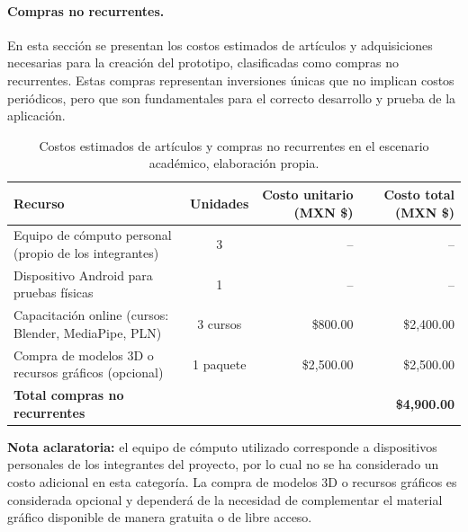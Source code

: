 \paragraph{\textbf{Compras no recurrentes.}} 
En esta sección se presentan los costos estimados de artículos y adquisiciones necesarias para la creación del prototipo, clasificadas como compras no recurrentes. Estas compras representan inversiones únicas que no implican costos periódicos, pero que son fundamentales para el correcto desarrollo y prueba de la aplicación.

\begin{table}[H]
	\centering
	\renewcommand{\arraystretch}{1.6}
	\setlength{\tabcolsep}{10pt}
	\Huge
	\begin{adjustbox}{max width=\textwidth}
		\begin{tabular}{|p{7cm}|c|r|r|}
			\hline
			\textbf{Recurso} & \textbf{Unidades} & \textbf{Costo unitario (MXN \$)} & \textbf{Costo total (MXN \$)} \\ \hline
			Equipo de cómputo personal (propio de los integrantes) & 3 & -- & -- \\ \hline
			Dispositivo Android para pruebas físicas & 1 & -- & -- \\ \hline
			Capacitación online (cursos: Blender, MediaPipe, PLN) & 3 cursos & \$800.00 & \$2,400.00 \\ \hline
			Compra de modelos 3D o recursos gráficos (opcional) & 1 paquete & \$2,500.00 & \$2,500.00 \\ \hline
			\textbf{Total compras no recurrentes} & & & \textbf{\$4,900.00} \\ \hline
		\end{tabular}
	\end{adjustbox}
	\caption[Costos estimados de artículos y compras no recurrentes en el escenario académico]{Costos estimados de artículos y compras no recurrentes en el escenario académico, elaboración propia.}
	\label{tab:compras_no_recurrentes}
\end{table}


\noindent \textbf{Nota aclaratoria:}  
el equipo de cómputo utilizado corresponde a dispositivos personales de los integrantes del proyecto, por lo cual no se ha considerado un costo adicional en esta categoría. La compra de modelos 3D o recursos gráficos es considerada opcional y dependerá de la necesidad de complementar el material gráfico disponible de manera gratuita o de libre acceso.

